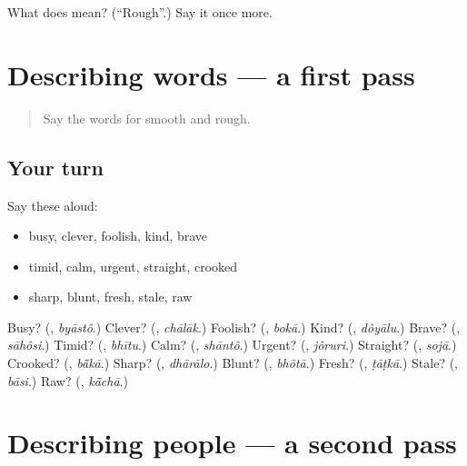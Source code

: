 \begin{tcolorbox}[breakable,colback=teal!4,colframe=teal!35!black,title={Before you move on}]
What does  mean? (\textquotedblleft{}Rough\textquotedblright{}.) Say it once more.
\end{tcolorbox}
\section[(dialogue)]{Describing words — a first pass}

\label{lesson:BN-R144-first-pass-describing-words}



\begin{quote}
Say the words for smooth and rough.
\end{quote}

\subsection*{Your turn}
Say these aloud:

\begin{itemize}
\raggedright
  \item busy, clever, foolish, kind, brave
  \item timid, calm, urgent, straight, crooked
  \item sharp, blunt, fresh, stale, raw
\end{itemize}

\begin{tcolorbox}[breakable,colback=teal!4,colframe=teal!35!black,title={Before you move on}]
Busy? (\textbf{}, \emph{byāstô}.) Clever? (\textbf{}, \emph{chālāk}.) Foolish? (\textbf{}, \emph{bokā}.) Kind? (\textbf{}, \emph{dôyālu}.) Brave? (\textbf{}, \emph{sāhôsi}.) Timid? (\textbf{}, \emph{bhītu}.) Calm? (\textbf{}, \emph{shāntô}.) Urgent? (\textbf{}, \emph{jôruri}.) Straight? (\textbf{}, \emph{sojā}.) Crooked? (\textbf{}, \emph{bā̃kā}.) Sharp? (\textbf{}, \emph{dhārālo}.) Blunt? (\textbf{}, \emph{bhõtā}.) Fresh? (\textbf{}, \emph{ṭāṭkā}.) Stale? (\textbf{}, \emph{bāsi}.) Raw? (\textbf{}, \emph{kā̃chā}.)
\end{tcolorbox}
\section[(dialogue)]{Describing people — a second pass}

